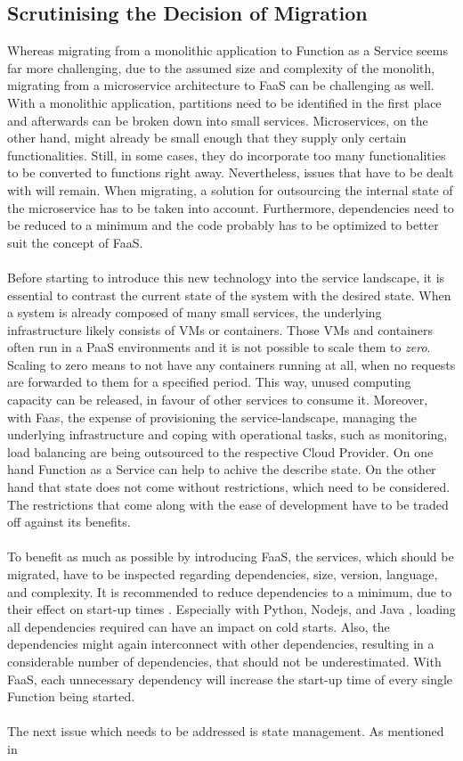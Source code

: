 \documentclass[a4paper,twoside,11pt, pagesize]{scrartcl}
\begin{document}
\begin{spacing}{1.2}
\subsection{Scrutinising the Decision of Migration}
Whereas migrating from a monolithic application to Function as a Service seems far more challenging, due to the assumed size and complexity of the monolith, migrating from a microservice architecture to FaaS can be challenging as well. With a monolithic application, partitions need to be identified in the first place and afterwards can be broken down into small services. Microservices, on the other hand, might already be small enough that they supply only certain functionalities. Still, in some cases, they do incorporate too many functionalities to be converted to functions right away. Nevertheless, issues that have to be dealt with will remain. When migrating, a solution for outsourcing the internal state of the microservice has to be taken into account. Furthermore, dependencies need to be reduced to a minimum and the code probably has to be optimized to better suit the concept of FaaS.\\\\ Before starting to introduce this new technology into the service landscape, it is essential to contrast the current state of the system with the desired state. When a system is already composed of many small services, the underlying infrastructure likely consists of VMs or containers. Those VMs and containers often run in a PaaS environments and it is not possible to scale them to \textit{zero}. Scaling to zero means to not have any containers running at all, when no requests are forwarded to them for a specified period. This way, unused computing capacity can be released, in favour of other services to consume it. Moreover, with Faas, the expense of provisioning the service-landscape, managing the underlying infrastructure and coping with operational tasks, such as monitoring, load balancing are being outsourced to the respective Cloud Provider. On one hand Function as a Service can help to achive the describe state. On the other hand that state does not come without restrictions, which need to be considered. The restrictions that come along with the ease of development have to be traded off against its benefits.\\\\ To benefit as much as possible by introducing FaaS, the services, which should be migrated, have to be inspected regarding dependencies, size, version, language, and complexity. It is recommended to reduce dependencies to a minimum, due to their effect on start-up times \cite{manner2018cold}. Especially with Python, Nodejs, and Java \cite{puripunpinyo2017effect}, loading all dependencies required can have an impact on cold starts. Also, the dependencies might again interconnect with other dependencies, resulting in a considerable number of dependencies, that should not be underestimated. With FaaS, each unnecessary dependency will increase the start-up time of every single Function being started.\\\\ The next issue which needs to be addressed is state management. As mentioned in 
\end{spacing}
\end{document}
